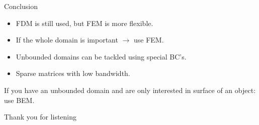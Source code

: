 \documentclass[]{beamer}
\begin{document}
\begin{frame}{Conclusion}
  \begin{itemize}
    \item FDM is still used, but FEM is more flexible.
    \item If the whole domain is important $\rightarrow$ use FEM.
    \item Unbounded domains can be tackled using special BC's.
    \item Sparse matrices with low bandwidth.
  \end{itemize}

  If you have an unbounded domain and are only interested in surface of
  an object: use BEM.
\end{frame}

\begin{frame}
\begin{center}
  {\Large Thank you for listening}
\end{center}
\end{frame}
%
%
\end{document}
